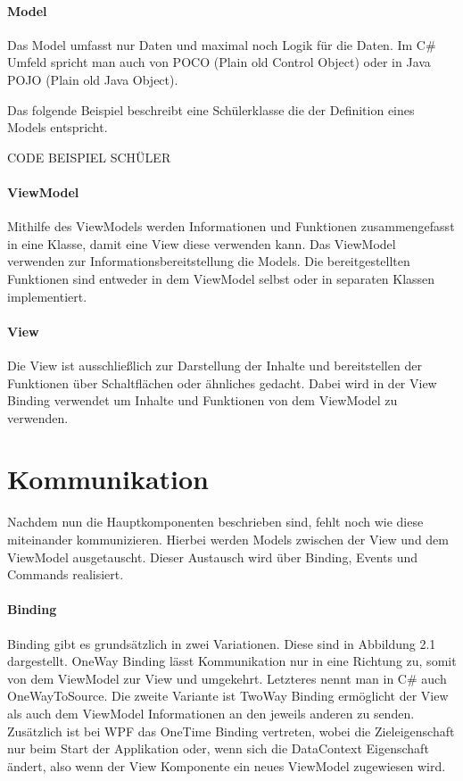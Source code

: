 \documentclass[titlepage=false,12pt]{scrreprt}
\begin{document}
\paragraph{Model}

Das Model umfasst nur Daten und maximal noch Logik für die Daten. 
Im C\# Umfeld spricht man auch von POCO (Plain old Control Object) 
oder in Java POJO (Plain old Java Object).
	
Das folgende Beispiel beschreibt eine Schülerklasse die der Definition 
eines Models entspricht.

CODE BEISPIEL SCHÜLER

\paragraph{ViewModel}

Mithilfe des ViewModels werden Informationen und Funktionen zusammengefasst
in eine Klasse, damit eine View diese verwenden kann. Das ViewModel verwenden zur 
Informationsbereitstellung die Models. Die bereitgestellten Funktionen sind
entweder in dem ViewModel selbst oder in separaten Klassen implementiert.

\paragraph{View}

Die View ist ausschließlich zur Darstellung der Inhalte und bereitstellen der
Funktionen über Schaltflächen oder ähnliches gedacht. Dabei wird in der View
Binding verwendet um Inhalte und Funktionen von dem ViewModel zu verwenden.

\section{Kommunikation}

Nachdem nun die Hauptkomponenten beschrieben sind, fehlt noch wie diese miteinander 
kommunizieren. Hierbei werden Models zwischen der View und dem ViewModel ausgetauscht.
Dieser Austausch wird über Binding, Events und Commands realisiert.

\paragraph{Binding}

Binding gibt es grundsätzlich in zwei Variationen. Diese sind in Abbildung 2.1 dargestellt. OneWay Binding
lässt Kommunikation nur in eine Richtung zu, somit von dem ViewModel zur View und umgekehrt.
Letzteres nennt man in C\# auch OneWayToSource. Die zweite Variante ist TwoWay Binding ermöglicht
der View als auch dem ViewModel Informationen an den jeweils anderen zu senden. Zusätzlich ist 
bei WPF das OneTime Binding vertreten, wobei die Zieleigenschaft nur beim Start der Applikation 
oder, wenn sich die DataContext Eigenschaft ändert, also wenn der View Komponente ein neues 
ViewModel zugewiesen wird.
\end{document}
